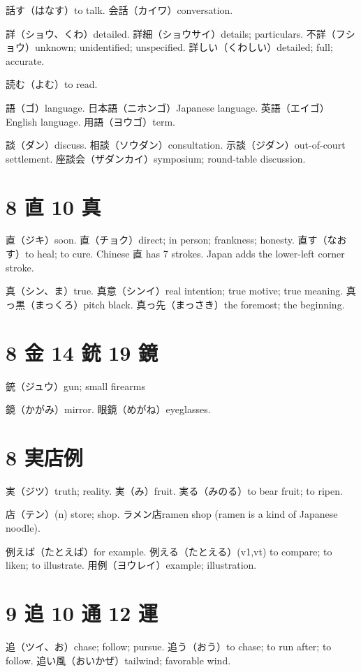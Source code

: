 話す（はなす）to talk.
会話（カイワ）conversation.

詳（ショウ、くわ）detailed.
詳細（ショウサイ）details; particulars.
不詳（フショウ）unknown; unidentified; unspecified.
詳しい（くわしい）detailed; full; accurate.

読む（よむ）to read.

語（ゴ）language.
日本語（ニホンゴ）Japanese language.
英語（エイゴ）English language.
用語（ヨウゴ）term.

談（ダン）discuss.
相談（ソウダン）consultation.
示談（ジダン）out-of-court settlement.
座談会（ザダンカイ）symposium; round-table discussion.

\section{8 直 10 真}

直（ジキ）soon.
直（チョク）direct; in person; frankness; honesty.
直す（なおす）to heal; to cure.
Chinese 直 has 7 strokes.
Japan adds the lower-left corner stroke.

真（シン、ま）true.
真意（シンイ）real intention; true motive; true meaning.
真っ黒（まっくろ）pitch black.
真っ先（まっさき）the foremost; the beginning.

\section{8 金 14 銃 19 鏡}

銃（ジュウ）gun; small firearms

鏡（かがみ）mirror.
眼鏡（めがね）eyeglasses.

\section{8 実店例}

実（ジツ）truth; reality.
実（み）fruit.
実る（みのる）to bear fruit; to ripen.

店（テン）(n) store; shop.
ラメン店ramen shop (ramen is a kind of Japanese noodle).

例えば（たとえば）for example.
例える（たとえる）(v1,vt)
to compare; to liken; to illustrate.
用例（ヨウレイ）example; illustration.

\section{9 追 10 通 12 運}

追（ツイ、お）chase; follow; pursue.
追う（おう）to chase; to run after; to follow.
追い風（おいかぜ）tailwind; favorable wind.

